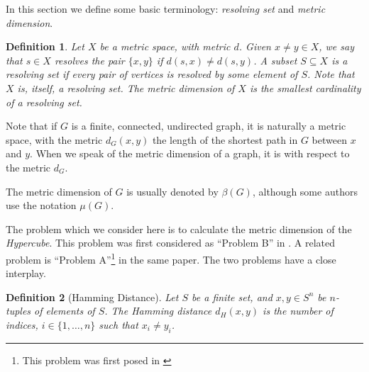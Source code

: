 \documentclass{article}
\newtheorem{definition}{Definition}
\begin{document}
In this section we define some basic terminology: \emph{resolving set}
and \emph{metric dimension}.

\begin{definition}
  Let $X$ be a metric space, with metric $d$.  Given $x \ne y \in X$,
  we say that $s \in X$ \emph{resolves} the pair $\{x,y\}$ if $d(s,x)
  \ne d(s,y)$.  A subset $S \subseteq X$ is a \emph{resolving set} if
  every pair of vertices is resolved by some element of $S$.  Note
  that $X$ is, itself, a resolving set.  The \emph{metric dimension}
  of $X$ is the smallest cardinality of a resolving set.
\end{definition}

Note that if $G$ is a finite, connected, undirected graph, it is
naturally a metric space, with the metric $d_G(x,y)$ the length of the
shortest path in $G$ between $x$ and $y$.  When we speak of the metric
dimension of a graph, it is with respect to the metric $d_G$.

The metric dimension of $G$ is usually denoted by $\beta(G)$, although
some authors use the notation $\mu(G)$.

The problem which we consider here is to calculate the metric
dimension of the \emph{Hypercube}.  This problem was first considered
as ``Problem B'' in \cite{erdos1963two}.  A related problem is
``Problem A''\footnote{This problem was first posed in
  \cite{shapiro1963combinatory}} in the same paper.  The two problems
have a close interplay.

\begin{definition}[Hamming Distance]
  Let $S$ be a finite set, and $x,y \in S^n$ be $n$-tuples of elements
  of $S$.  The \emph{Hamming distance} $d_H(x,y)$ is the number of
  indices, $i \in \{1, \dots, n\}$ such that $x_i \ne y_i$.
\end{definition}
\end{document}
